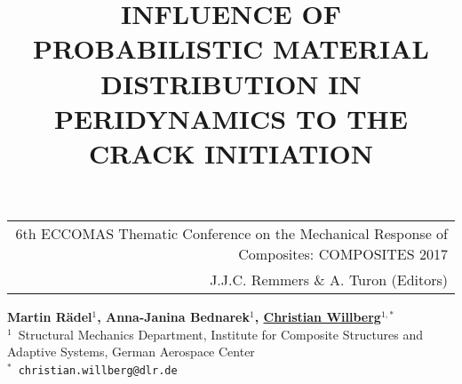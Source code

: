 \documentclass[12pt,a4paper]{article}
\begin{document}
\thispagestyle{empty}

\vspace*{-3.4cm}
\begin{table}[!h]
\begin{tabular}{r}
\hspace*{2.9cm} \scriptsize \textsf{6th ECCOMAS Thematic Conference on the Mechanical Response of Composites: COMPOSITES 2017} \\
\hspace*{2.9cm} \tiny \textsf{J.J.C. Remmers \& A. Turon (Editors)}
\end{tabular}
\end{table}

\vspace*{-0.7cm}

\begin{center}
\title{INFLUENCE OF PROBABILISTIC MATERIAL DISTRIBUTION IN PERIDYNAMICS TO THE CRACK INITIATION}
\end{center}
\begin{center}
\textbf{Martin R\"adel$^{1}$, Anna-Janina Bednarek$^{1}$, \underline{Christian Willberg}$^{1,*}$} \\ [7pt]
\small{$^1$}~Structural Mechanics Department, Institute for Composite Structures and Adaptive Systems, German Aerospace Center  \\  [2pt]
\small{$^*$~\texttt{christian.willberg@dlr.de}} \\
\end{center}
\end{document}
